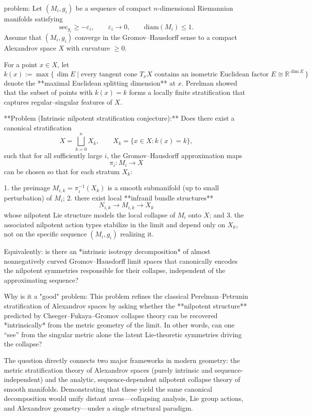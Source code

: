 problem:  
Let \((M_i, g_i)\) be a sequence of compact \(n\)-dimensional Riemannian manifolds satisfying  
\[
\mathrm{sec}_{g_i} \ge -\varepsilon_i, \qquad \varepsilon_i \to 0, \qquad \mathrm{diam}(M_i) \le 1.
\]
Assume that \((M_i, g_i)\) converge in the Gromov–Hausdorff sense to a compact Alexandrov space \(X\) with curvature \(\ge 0\).  

For a point \(x \in X\), let  
\[
k(x) := \max\{\, \dim E \mid \text{every tangent cone } T_xX \text{ contains an isometric Euclidean factor } E \cong \mathbb{R}^{\dim E}\,\}
\]
denote the **maximal Euclidean splitting dimension** at \(x\).  Perelman showed that the subset of points with \(k(x) = k\) forms a locally finite stratification that captures regular–singular features of \(X\).

**Problem (Intrinsic nilpotent stratification conjecture):**  
Does there exist a canonical stratification  
\[
X = \bigsqcup_{k=0}^n X_k, \qquad X_k = \{x \in X : k(x) = k\},
\]
such that for all sufficiently large \(i\), the Gromov–Hausdorff approximation maps
\[
\pi_i \colon M_i \to X
\]
can be chosen so that for each stratum \(X_k\):

1. the preimage \(M_{i,k} = \pi_i^{-1}(X_k)\) is a smooth submanifold (up to small perturbation) of \(M_i\);  
2. there exist local **infranil bundle structures**
   \[
   N_{i,k} \longrightarrow M_{i,k} \longrightarrow X_k
   \]
   whose nilpotent Lie structure models the local collapse of \(M_i\) onto \(X\); and  
3. the associated nilpotent action types stabilize in the limit and depend only on \(X_k\), not on the specific sequence \((M_i, g_i)\) realizing it.  

Equivalently: is there an *intrinsic isotropy decomposition* of almost nonnegatively curved Gromov–Hausdorff limit spaces that canonically encodes the nilpotent symmetries responsible for their collapse, independent of the approximating sequence?

Why is it a "good" problem:  
This problem refines the classical Perelman–Petrunin stratification of Alexandrov spaces by asking whether the **nilpotent structure** predicted by Cheeger–Fukaya–Gromov collapse theory can be recovered *intrinsically* from the metric geometry of the limit.  In other words, can one “see” from the singular metric alone the latent Lie-theoretic symmetries driving the collapse?  

The question directly connects two major frameworks in modern geometry: the metric stratification theory of Alexandrov spaces (purely intrinsic and sequence-independent) and the analytic, sequence-dependent nilpotent collapse theory of smooth manifolds.  Demonstrating that these yield the same canonical decomposition would unify distant areas—collapsing analysis, Lie group actions, and Alexandrov geometry—under a single structural paradigm.  

